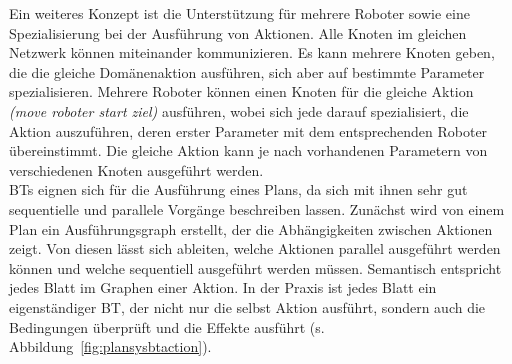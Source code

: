 Ein weiteres Konzept ist die Unterstützung für mehrere Roboter sowie eine Spezialisierung bei der Ausführung von Aktionen.
Alle Knoten im gleichen Netzwerk können miteinander kommunizieren.
Es kann mehrere Knoten geben, die die gleiche Domänenaktion ausführen, sich aber auf bestimmte Parameter spezialisieren.
Mehrere Roboter können einen Knoten für die gleiche Aktion \emph{(move roboter start ziel)} ausführen, wobei sich jede darauf spezialisiert, die Aktion auszuführen, deren erster Parameter mit dem entsprechenden Roboter übereinstimmt.
Die gleiche Aktion kann je nach vorhandenen Parametern von verschiedenen Knoten ausgeführt werden.\\
\acp{BT} eignen sich für die Ausführung eines Plans, da sich mit ihnen sehr gut sequentielle und parallele Vorgänge beschreiben lassen.
Zunächst wird von einem Plan ein Ausführungsgraph erstellt, der die Abhängigkeiten zwischen Aktionen zeigt.
Von diesen lässt sich ableiten, welche Aktionen parallel ausgeführt werden können und welche sequentiell ausgeführt werden müssen.
Semantisch entspricht jedes Blatt im Graphen einer Aktion.
In der Praxis ist jedes Blatt ein eigenständiger \ac{BT}, der nicht nur die selbst Aktion ausführt, sondern auch die Bedingungen überprüft und die Effekte ausführt (s. Abbildung~\ref{fig:plansysbtaction}).\\

